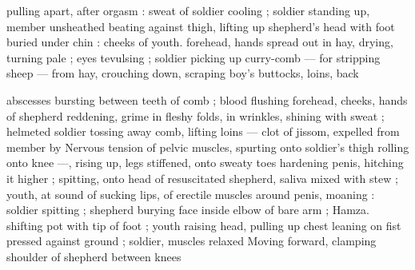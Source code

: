 pulling apart, after orgasm : sweat of soldier cooling ; soldier
standing up, member unsheathed beating against thigh, lifting up
shepherd's head with foot buried under chin : cheeks of youth.
forehead, hands spread out in hay, drying, turning pale ; eyes
tevulsing ; soldier picking up curry-comb — for stripping sheep —
from hay, crouching down, scraping boy's buttocks, loins, back

abscesses bursting between teeth of comb ; blood flushing
forehead, cheeks, hands of shepherd reddening, grime in fleshy
folds, in wrinkles, shining with sweat ; helmeted soldier tossing away
comb, lifting loins — clot of jissom, expelled from member by
Nervous tension of pelvic muscles, spurting onto soldier's thigh
rolling onto knee —, rising up, legs stiffened, onto sweaty toes
hardening penis, hitching it higher ; spitting, onto head of
resuscitated shepherd, saliva mixed with stew ; youth, at sound of
sucking lips, of erectile muscles around penis, moaning : soldier
spitting ; shepherd burying face inside elbow of bare arm ; Hamza.
shifting pot with tip of foot ; youth raising head, pulling up chest
leaning on fist pressed against ground ; soldier, muscles relaxed
Moving forward, clamping shoulder of shepherd between knees

